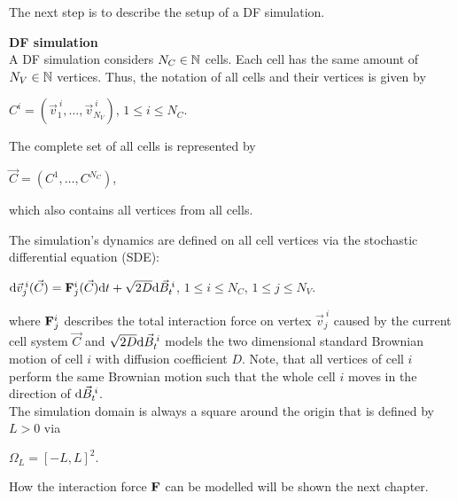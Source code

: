 The next step is to describe the setup of a DF simulation. 
\begin{definition} \textbf{DF simulation} \label{def:DF-Sim}  \\
	A DF simulation considers $N_C \in \mathbb{N}$ cells. 
	Each cell has the same amount of $N_V \in \mathbb{N}$ vertices.
	Thus, the notation of all cells and their vertices is given by 
	\begin{center}
		$C^{i} = (\vec{v}^{\:i}_1, \ldots, \vec{v}^{\:i}_{N_V})$, \hspace{0.5em} $1 \leq i \leq N_{C}$. 
	\end{center}

	The complete set of all cells is represented by 
	\begin{center}
		$\vec{C} = (C^{1}, \ldots, C^{N_C})$,
	\end{center}
	which also contains all vertices from all cells.

	The simulation's dynamics are defined on all cell vertices via the stochastic differential equation (SDE):
	\begin{center}
		$ \mathrm{d} \vec{v}^{\:i}_j(\vec{C}) = \mathbf{F}^i_j(\vec{C}) \mathrm{d} t + \sqrt{2 D} \mathrm{d} \vec{B}^{\:i}_t$, \hspace{0.5em} $1 \leq i \leq N_{C}$, \hspace{0.5em} $1 \leq j \leq N_{V}$. 
	\end{center}
	where $\mathbf{F}^i_j$ describes the total interaction force on vertex $\vec{v}^{\:i}_j$ caused by the current cell system $\vec{C}$ and $\sqrt{2 D} \mathrm{d} \vec{B}^{\:i}_t$ models the two dimensional standard Brownian motion of cell $i$ with diffusion coefficient $D$.  
	Note, that all vertices of cell $i$ perform the same Brownian motion such that the whole cell $i$ moves in the direction of $\mathrm{d} \vec{B}^{\:i}_t$. \\

	The simulation domain is always a square around the origin that is defined by $L > 0$ via 
	\begin{center}
		$
		\Omega_L = [-L, L]^2.
		$
	\end{center} 
\end{definition}

How the interaction force $\mathbf{F}$ can be modelled will be shown the next chapter. 





